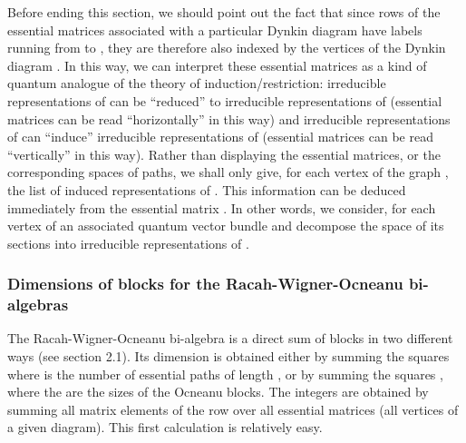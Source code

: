 \documentclass[a4paper,11pt]{article}
\begin{document}
Before ending this section, we should point out the fact that since
rows of the essential
matrices associated with a particular Dynkin diagram \coordHE{} have labels
\coordHE{} running
from \coordHE{} to \coordHE{}, they are therefore also indexed by the
vertices \coordHE{}
of the Dynkin diagram \coordHE{}. In this way, we can interpret these
essential
matrices as a kind of quantum analogue of the theory of induction/restriction:
irreducible representations of \coordHE{} can be ``reduced'' to
irreducible
representations
of \coordHE{} (essential matrices can be read ``horizontally'' in this way) and
irreducible representations of \coordHE{} can ``induce'' irreducible
representations of
\coordHE{}
       (essential matrices can be read ``vertically'' in this way).
Rather than displaying the essential matrices, or the corresponding
spaces of paths,
we shall only give, for each vertex of the graph \coordHE{}, the list of induced
representations of \coordHE{}.
This information can be deduced immediately from the essential matrix
\coordHE{}. In other
words,
we consider, for  each vertex \coordHE{} of \coordHE{}  an associated quantum vector
bundle
and decompose the space of its sections into irreducible representations
of \coordHE{}.

\subsubsection{Dimensions of blocks for the  Racah-Wigner-Ocneanu
bi-algebras}
The Racah-Wigner-Ocneanu  bi-algebra \coordHE{} is a direct sum of
blocks in two different ways (see section 2.1). Its dimension
is obtained either by
summing the squares \coordHE{} where \coordHE{} is the number of essential
paths of length
\coordHE{}, or by summing the squares \coordHE{}, where the \coordHE{} are
the sizes of the Ocneanu blocks.
The integers \coordHE{} are obtained by summing all matrix elements of
the row \coordHE{}
over all essential matrices \coordHE{} (all vertices \coordHE{} of a given diagram).
This first calculation is relatively easy.
\end{document}
